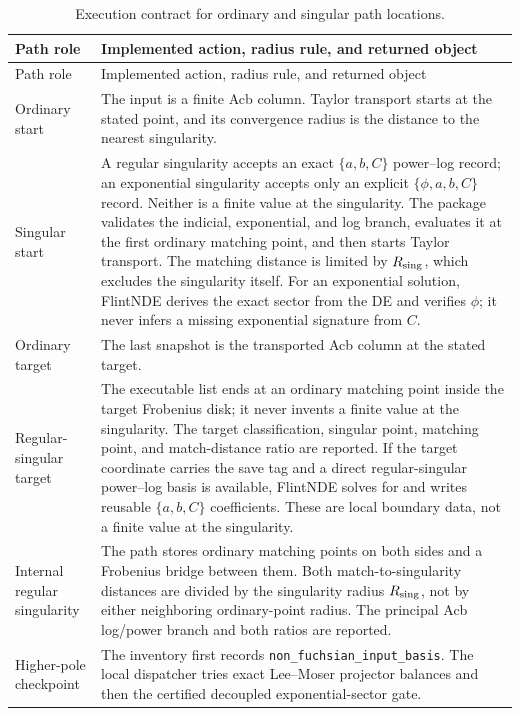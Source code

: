 \documentclass[11pt]{article}
\begin{document}
\small
\begin{longtable}{L{0.22\textwidth}L{0.72\textwidth}}
\caption{Execution contract for ordinary and singular path locations.}
\label{tab:path-location-contract}\\
\toprule
Path role & Implemented action, radius rule, and returned object \\
\midrule
\endfirsthead
\toprule
Path role & Implemented action, radius rule, and returned object \\
\midrule
\endhead
Ordinary start & The input is a finite Acb column.  Taylor transport starts at the stated
point, and its convergence radius is the distance to the nearest singularity. \\
Singular start & A regular singularity accepts an exact $\{a,b,C\}$ power--log record;
an exponential singularity accepts only an explicit $\{\phi,a,b,C\}$ record.  Neither is
a finite value at the singularity.  The package validates the indicial, exponential, and log
branch, evaluates it at the first ordinary matching point, and then starts Taylor transport.
The matching distance is limited by $R_{\rm sing}$, which excludes the singularity itself.
For an exponential solution, FlintNDE derives the exact sector from the DE and verifies
$\phi$; it never infers a missing exponential signature from $C$. \\
Ordinary target & The last snapshot is the transported Acb column at the stated target. \\
Regular-singular target & The executable list ends at an ordinary matching point inside the
target Frobenius disk; it never invents a finite value at the singularity.  The target
classification, singular point, matching point, and match-distance ratio are reported.  If
the target coordinate carries the save tag and a direct regular-singular power--log basis is
available, FlintNDE solves for and writes reusable $\{a,b,C\}$ coefficients.  These are local
boundary data, not a finite value at the singularity. \\
Internal regular singularity & The path stores ordinary matching points on both sides and a
Frobenius bridge between them.  Both match-to-singularity distances are divided by the
singularity radius $R_{\rm sing}$, not by either neighboring ordinary-point radius.  The
principal Acb log/power branch and both ratios are reported. \\
Higher-pole checkpoint & The inventory first records
\texttt{non\_fuchsian\_input\_basis}.  The local dispatcher tries exact Lee--Moser
projector balances and then the certified decoupled exponential-sector gate.

\end{longtable}
\end{document}
